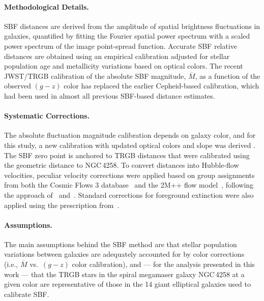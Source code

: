\paragraph{Methodological Details.}
SBF distances are derived from the amplitude of spatial brightness fluctuations in galaxies, quantified by fitting the Fourier spatial power spectrum with a scaled power spectrum of the image point-spread function. 
Accurate SBF relative distances are obtained using an empirical calibration adjusted for stellar population age and metallicity variations based on optical colors. 
The recent JWST/TRGB calibration of the absolute SBF magnitude, $\overline{M}$, as a function of the observed $({g - z})$ color has replaced the earlier Cepheid-based calibration, which had been used in almost all previous SBF-based distance estimates.

\paragraph{Systematic Corrections.}
The absolute fluctuation magnitude calibration depends on galaxy color, and for this study, a new calibration with updated optical colors and slope was derived \citep{2025ApJ...987...87J}. The SBF zero point is anchored to TRGB distances that were calibrated using the geometric distance to NGC\,4258. To convert distances into Hubble-flow velocities, peculiar velocity corrections were applied based on group assignments from both the Cosmic Flows 3 database~\citep{2019MNRAS.488.5438G} and the 2M++ flow model~\citep{2015MNRAS.450..317C}, following the approach of~\citet{2021ApJ...911...65B} and~\citet{2025ApJ...982...26A}. Standard corrections for foreground extinction were also applied using the prescription from~\citet{2011ApJ...737..103S}.

\paragraph{Assumptions.} 
The main assumptions behind the SBF method are that stellar population variations between galaxies are adequately accounted for by color corrections (i.e., $\overline{M}$ vs.\ $({g-z})$ color calibration), and — for the analysis presented in this work — that the TRGB stars in the spiral megamaser galaxy NGC\,4258 at a given color are representative of those in the 14 giant elliptical galaxies used to calibrate SBF.

